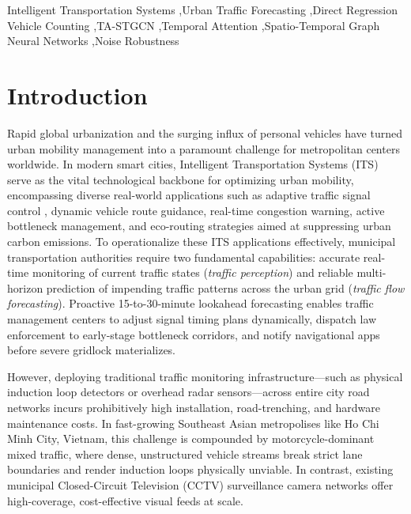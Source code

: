 \documentclass[a4paper,fleqn]{cas-sc}
\begin{document}
\begin{keywords}
Intelligent Transportation Systems \sep Urban Traffic Forecasting \sep Direct Regression Vehicle Counting \sep TA-STGCN \sep Temporal Attention \sep Spatio-Temporal Graph Neural Networks \sep Noise Robustness
\end{keywords}

\maketitle

\section{Introduction}
\label{sec:intro}

Rapid global urbanization and the surging influx of personal vehicles have turned urban mobility management into a paramount challenge for metropolitan centers worldwide. In modern smart cities, Intelligent Transportation Systems (ITS) serve as the vital technological backbone for optimizing urban mobility, encompassing diverse real-world applications such as adaptive traffic signal control \cite{signal_control}, dynamic vehicle route guidance, real-time congestion warning, active bottleneck management, and eco-routing strategies aimed at suppressing urban carbon emissions. To operationalize these ITS applications effectively, municipal transportation authorities require two fundamental capabilities: accurate real-time monitoring of current traffic states (\emph{traffic perception}) and reliable multi-horizon prediction of impending traffic patterns across the urban grid (\emph{traffic flow forecasting}). Proactive 15-to-30-minute lookahead forecasting enables traffic management centers to adjust signal timing plans dynamically, dispatch law enforcement to early-stage bottleneck corridors, and notify navigational apps before severe gridlock materializes.

However, deploying traditional traffic monitoring infrastructure—such as physical induction loop detectors or overhead radar sensors—across entire city road networks incurs prohibitively high installation, road-trenching, and hardware maintenance costs. In fast-growing Southeast Asian metropolises like Ho Chi Minh City, Vietnam, this challenge is compounded by motorcycle-dominant mixed traffic, where dense, unstructured vehicle streams break strict lane boundaries and render induction loops physically unviable. In contrast, existing municipal Closed-Circuit Television (CCTV) surveillance camera networks offer high-coverage, cost-effective visual feeds at scale. 
\end{document}
